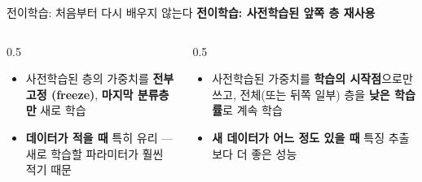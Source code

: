\begin{frame}{전이학습: 처음부터 다시 배우지 않는다}
  \textbf{전이학습: 사전학습된 앞쪽 층 재사용}
  \begin{columns}[T]
    \begin{column}{0.5\textwidth}
      \begin{itemize}
        \item 사전학습된 층의 가중치를 \textbf{전부 고정
          (freeze)}, \textbf{마지막 분류층만} 새로 학습
        \item \textbf{데이터가 적을 때} 특히 유리 ---
          새로 학습할 파라미터가 훨씬 적기 때문
      \end{itemize}
    \end{column}
    \begin{column}{0.5\textwidth}
      \begin{itemize}
        \item 사전학습된 가중치를 \textbf{학습의 시작점}으로만
          쓰고, 전체(또는 뒤쪽 일부) 층을 \textbf{낮은 학습률}로
          계속 학습
        \item \textbf{새 데이터가 어느 정도 있을 때} 특징 추출보다
          더 좋은 성능
      \end{itemize}
    \end{column}
  \end{columns}

\end{frame}
